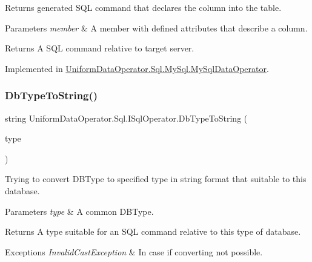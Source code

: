 Returns generated S\+QL command that declares the column into the table. 


\begin{DoxyParams}{Parameters}
{\em member} & A member with defined attributes that describe a column.\\
\hline
\end{DoxyParams}
\begin{DoxyReturn}{Returns}
A S\+QL command relative to target server.
\end{DoxyReturn}


Implemented in \mbox{\hyperlink{class_uniform_data_operator_1_1_sql_1_1_my_sql_1_1_my_sql_data_operator_a0bdc2943e5d10576fb564913cdd744e7}{Uniform\+Data\+Operator.\+Sql.\+My\+Sql.\+My\+Sql\+Data\+Operator}}.

\mbox{\label{interface_uniform_data_operator_1_1_sql_1_1_i_sql_operator_a51af40df39808d53cdcc81852b836634}} 
\subsubsection{\texorpdfstring{Db\+Type\+To\+String()}{DbTypeToString()}}
{\footnotesize\ttfamily string Uniform\+Data\+Operator.\+Sql.\+I\+Sql\+Operator.\+Db\+Type\+To\+String (\begin{DoxyParamCaption}\item[{Db\+Type}]{type }\end{DoxyParamCaption})}



Trying to convert D\+B\+Type to specified type in string format that suitable to this database. 


\begin{DoxyParams}{Parameters}
{\em type} & A common D\+B\+Type. \\
\hline
\end{DoxyParams}
\begin{DoxyReturn}{Returns}
A type suitable for an S\+QL command relative to this type of database. 
\end{DoxyReturn}

\begin{DoxyExceptions}{Exceptions}
{\em Invalid\+Cast\+Exception} & In case if converting not possible. \\
\hline
\end{DoxyExceptions}


